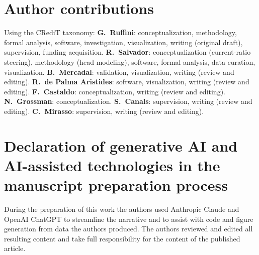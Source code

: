 \documentclass[11pt,a4paper]{article}
\newif\ifsupp
\begin{document}
\section*{Author contributions}
Using the CRediT taxonomy: \textbf{G.~Ruffini}: conceptualization, methodology, formal
analysis, software, investigation, visualization, writing (original draft), supervision,
funding acquisition. \textbf{R.~Salvador}: conceptualization (current-ratio steering),
methodology (head modeling), software, formal analysis, data curation, visualization.
\textbf{B.~Mercadal}: validation, visualization, writing (review and editing).
\textbf{R.~de Palma Aristides}: software, visualization, writing (review and editing).
\textbf{F.~Castaldo}: conceptualization, writing (review and editing).
\textbf{N.~Grossman}: conceptualization.
\textbf{S.~Canals}: supervision, writing (review and editing).
\textbf{C.~Mirasso}: supervision, writing (review and editing).
\fi

\section*{Declaration of generative AI and AI-assisted technologies in the manuscript
preparation process}
During the preparation of this work the authors used Anthropic Claude and OpenAI ChatGPT to
streamline the narrative and to assist with code and figure generation from data the authors
produced. The authors reviewed and edited all resulting content and take full responsibility
for the content of the published article.




\fi
\clearpage
\appendix
\makeatletter
\let\ne@stdsection\section
\renewcommand{\section}{\clearpage\ne@stdsection}
\makeatother
\ifsupp
\end{document}
